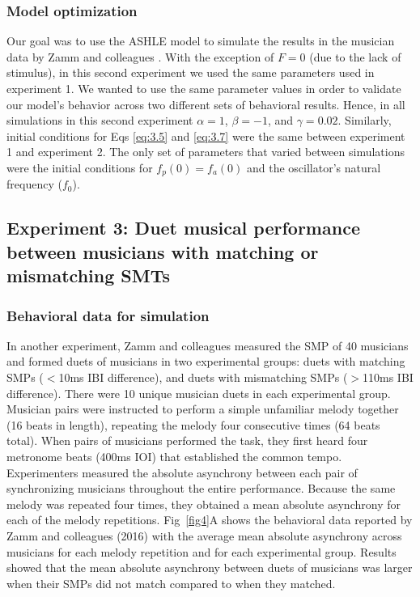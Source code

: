 \documentclass[10pt,letterpaper]{article}
\begin{document}
\subsubsection*{Model optimization}

Our goal was to use the ASHLE model to simulate the results in the musician data by Zamm and colleagues \cite{zamm2018musicians}. With the exception of $F = 0$ (due to the lack of stimulus), in this second experiment we used the same parameters used in experiment 1. We wanted to use the same parameter values in order to validate our model's behavior across two different sets of behavioral results. Hence, in all simulations in this second experiment $\alpha = 1$, $\beta = −1$, and $\gamma =  0.02$. Similarly, initial conditions for Eqs \eqref{eq:3.5} and \eqref{eq:3.7} were the same between experiment 1 and experiment 2. The only set of parameters that varied between simulations were the initial conditions for $f_p(0)=f_a(0)$ and the oscillator's natural frequency ($f_0$).

\subsection*{Experiment 3: Duet musical performance between musicians with matching or mismatching SMTs}

\subsubsection*{Behavioral data for simulation}

In another experiment, Zamm and colleagues \cite{zamm2016endogenous} measured the SMP of 40 musicians and formed duets of musicians in two experimental groups: duets with matching SMPs ($<$10ms IBI difference), and duets with mismatching SMPs ($>$110ms IBI difference). There were 10 unique musician duets in each experimental group. Musician pairs were instructed to perform a simple unfamiliar melody together (16 beats in length), repeating the melody four consecutive times (64 beats total). When pairs of musicians performed the task, they first heard four metronome beats (400ms IOI) that established the common tempo. Experimenters measured the absolute asynchrony between each pair of synchronizing musicians throughout the entire performance. Because the same melody was repeated four times, they obtained a mean absolute asynchrony for each of the melody repetitions. Fig~\ref{fig4}A shows the behavioral data reported by Zamm and colleagues (2016) with the average mean absolute asynchrony across musicians for each melody repetition and for each experimental group. Results showed that the mean absolute asynchrony between duets of musicians was larger when their SMPs did not match compared to when they matched.
\end{document}

